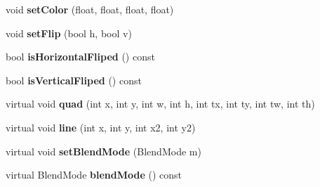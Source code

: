 \begin{DoxyCompactItemize}
\item 
\hypertarget{struct_tempest_1_1_surface_render_1_1_paint_dev_a0d32cc2c97a4d5bf742ca23bdaf5713d}{void {\bfseries set\+Color} (float, float, float, float)}\label{struct_tempest_1_1_surface_render_1_1_paint_dev_a0d32cc2c97a4d5bf742ca23bdaf5713d}

\item 
\hypertarget{struct_tempest_1_1_surface_render_1_1_paint_dev_a1c55c9b280483dca13b73b17ad3537ae}{void {\bfseries set\+Flip} (bool h, bool v)}\label{struct_tempest_1_1_surface_render_1_1_paint_dev_a1c55c9b280483dca13b73b17ad3537ae}

\item 
\hypertarget{struct_tempest_1_1_surface_render_1_1_paint_dev_aa2558b548be89fe2c20e67bfcd16a852}{bool {\bfseries is\+Horizontal\+Fliped} () const }\label{struct_tempest_1_1_surface_render_1_1_paint_dev_aa2558b548be89fe2c20e67bfcd16a852}

\item 
\hypertarget{struct_tempest_1_1_surface_render_1_1_paint_dev_a859abbe146d4260e1a42611ed6a0baab}{bool {\bfseries is\+Vertical\+Fliped} () const }\label{struct_tempest_1_1_surface_render_1_1_paint_dev_a859abbe146d4260e1a42611ed6a0baab}

\item 
\hypertarget{struct_tempest_1_1_surface_render_1_1_paint_dev_a18ce0296bf93b4ab044322462163ea56}{virtual void {\bfseries quad} (int x, int y, int w, int h, int tx, int ty, int tw, int th)}\label{struct_tempest_1_1_surface_render_1_1_paint_dev_a18ce0296bf93b4ab044322462163ea56}

\item 
\hypertarget{struct_tempest_1_1_surface_render_1_1_paint_dev_a32bccd4fccafe828611ac21db5e91057}{virtual void {\bfseries line} (int x, int y, int x2, int y2)}\label{struct_tempest_1_1_surface_render_1_1_paint_dev_a32bccd4fccafe828611ac21db5e91057}

\item 
\hypertarget{struct_tempest_1_1_surface_render_1_1_paint_dev_ae8db46e418adc005a9fee72fd87efd49}{virtual void {\bfseries set\+Blend\+Mode} (Blend\+Mode m)}\label{struct_tempest_1_1_surface_render_1_1_paint_dev_ae8db46e418adc005a9fee72fd87efd49}

\item 
\hypertarget{struct_tempest_1_1_surface_render_1_1_paint_dev_a1783fd4ba34de081ba127f636787ff26}{virtual Blend\+Mode {\bfseries blend\+Mode} () const }\label{struct_tempest_1_1_surface_render_1_1_paint_dev_a1783fd4ba34de081ba127f636787ff26}


\end{DoxyCompactItemize}
